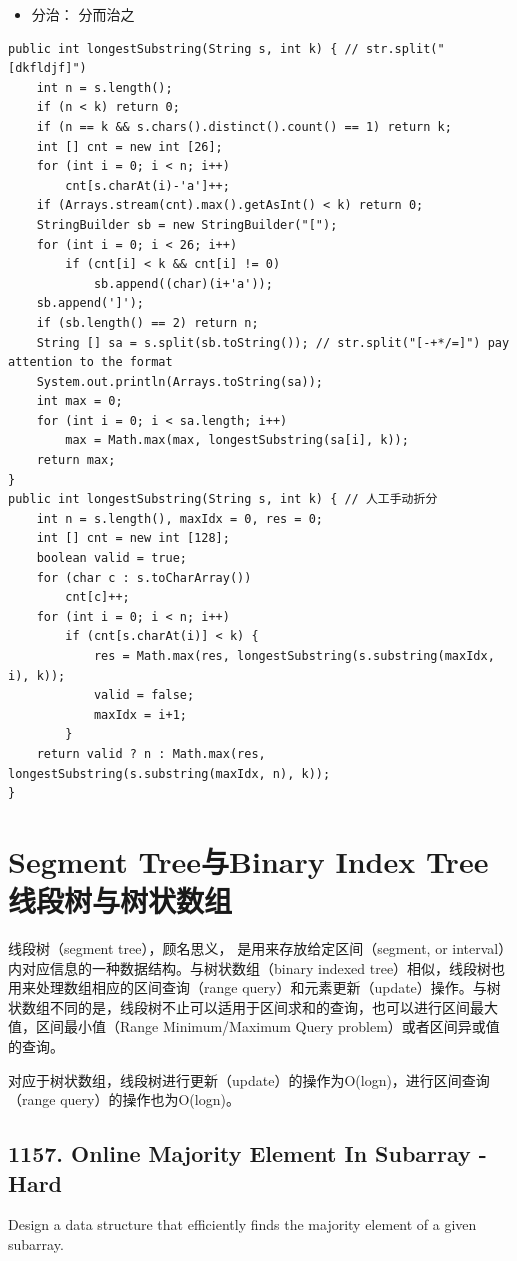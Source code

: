\documentclass[9pt, b5paaper]{book}
\begin{document}
\begin{itemize}
\item 分治： 分而治之
\end{itemize}
\begin{verbatim}
public int longestSubstring(String s, int k) { // str.split("[dkfldjf]")
    int n = s.length();
    if (n < k) return 0;
    if (n == k && s.chars().distinct().count() == 1) return k;
    int [] cnt = new int [26];
    for (int i = 0; i < n; i++) 
        cnt[s.charAt(i)-'a']++;
    if (Arrays.stream(cnt).max().getAsInt() < k) return 0;
    StringBuilder sb = new StringBuilder("[");
    for (int i = 0; i < 26; i++) 
        if (cnt[i] < k && cnt[i] != 0)
            sb.append((char)(i+'a'));
    sb.append(']');
    if (sb.length() == 2) return n;
    String [] sa = s.split(sb.toString()); // str.split("[-+*/=]") pay attention to the format
    System.out.println(Arrays.toString(sa));
    int max = 0;
    for (int i = 0; i < sa.length; i++) 
        max = Math.max(max, longestSubstring(sa[i], k));
    return max;
}
public int longestSubstring(String s, int k) { // 人工手动折分
    int n = s.length(), maxIdx = 0, res = 0;
    int [] cnt = new int [128];
    boolean valid = true;
    for (char c : s.toCharArray()) 
        cnt[c]++;
    for (int i = 0; i < n; i++) 
        if (cnt[s.charAt(i)] < k) {
            res = Math.max(res, longestSubstring(s.substring(maxIdx, i), k));
            valid = false;
            maxIdx = i+1;
        }
    return valid ? n : Math.max(res, longestSubstring(s.substring(maxIdx, n), k));
}
\end{verbatim}

\chapter{Segment Tree与Binary Index Tree 线段树与树状数组}
\label{sec-7}

线段树（segment tree），顾名思义， 是用来存放给定区间（segment, or interval）内对应信息的一种数据结构。与树状数组（binary indexed tree）相似，线段树也用来处理数组相应的区间查询（range query）和元素更新（update）操作。与树状数组不同的是，线段树不止可以适用于区间求和的查询，也可以进行区间最大值，区间最小值（Range Minimum/Maximum Query problem）或者区间异或值的查询。

对应于树状数组，线段树进行更新（update）的操作为O(logn)，进行区间查询（range query）的操作也为O(logn)。

\section{1157. Online Majority Element In Subarray - Hard}
\label{sec-7-1}
Design a data structure that efficiently finds the majority element of a given subarray.
\end{document}
